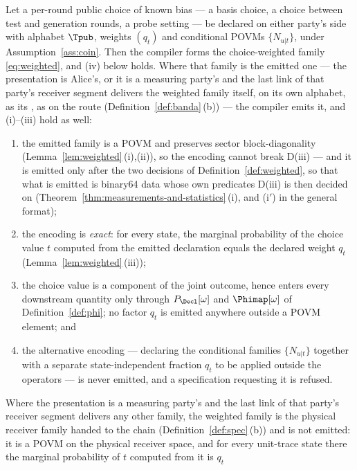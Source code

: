 \begin{theorem}
\label{thm:choice-encoding}
Let a per-round public choice of known bias --- a basis choice, a choice
between test and generation rounds, a probe setting --- be declared on either
party's side with alphabet $\Tpub$, weights $(q_t)$ and conditional POVMs
$\{N_{u|t}\}$, under Assumption~\ref{ass:coin}. Then the compiler forms the
choice-weighted family \eqref{eq:weighted}, and (iv) below holds. Where that
family is the emitted one --- the presentation is Alice's, or it is a
measuring party's and the last link of that party's receiver segment
delivers the weighted family itself, on its own alphabet, as its
, as on the  route
(Definition~\ref{def:banda}\,(b)) --- the compiler emits it, and (i)--(iii)
hold as well:
\begin{enumerate}[label=(\roman*),leftmargin=2.2em]
\item the emitted family is a POVM and preserves sector block-diagonality
(Lemma~\ref{lem:weighted}\,(i),(ii)), so the encoding cannot break D(iii) ---
and it is emitted only after the two decisions of
Definition~\ref{def:weighted}, so that what is emitted is binary64 data whose
own predicates D(iii) is then decided on
(Theorem~\ref{thm:measurements-and-statistics}\,(i), and (i$'$) in the
general format);
\item the encoding is \emph{exact}: for every state, the marginal probability
of the choice value $t$ computed from the emitted declaration equals the
declared weight $q_t$ (Lemma~\ref{lem:weighted}\,(iii));
\item the choice value is a component of the joint outcome, hence enters every
downstream quantity only through $P_{\Decl}[\omega]$ and
$\Phimap[\omega]$ of Definition~\ref{def:phi}; no factor $q_t$ is emitted
anywhere outside a POVM element; and
\item the alternative encoding --- declaring the conditional families
$\{N_{u|t}\}$ together with a separate state-independent fraction $q_t$ to be
applied outside the operators --- is never emitted, and a specification
requesting it is refused.
\end{enumerate}
Where the presentation is a measuring party's and the last link of that
party's receiver segment delivers any other family, the weighted family is
the physical receiver family handed to the chain
(Definition~\ref{def:spec}\,(b)) and is not emitted: it is a POVM on the
physical receiver space, and for every unit-trace state there the marginal
probability of $t$ computed from it is $q_t$

\end{theorem}

